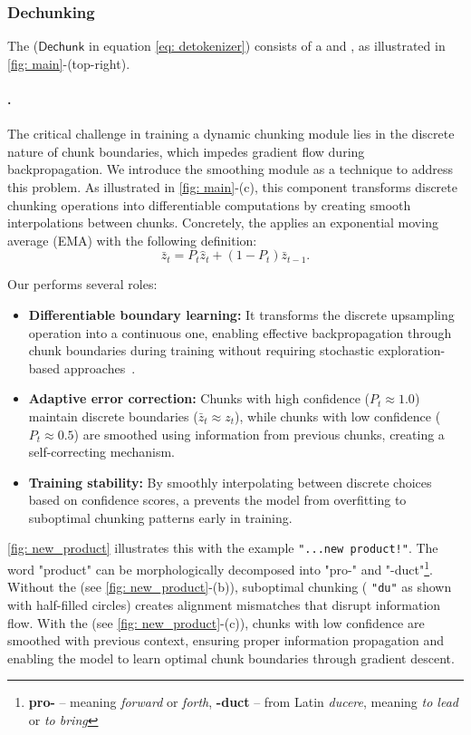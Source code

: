 \subsubsection{Dechunking}
\label{sec: detokenizer}

The \dechunk{} ($\mathsf{Dechunk}$ in equation \eqref{eq: detokenizer}) consists of a \smoother{} and \upsampler{}, as illustrated in \cref{fig: main}-(\colorbox{DeChunk}{top-right}).

\paragraph{\SMOOTHER{}.}
The critical challenge in training a dynamic chunking module lies in the discrete nature of chunk boundaries, which impedes gradient flow during backpropagation.
We introduce the smoothing module as a technique to address this problem.
As illustrated in \cref{fig: main}-(c), this component transforms discrete chunking operations into differentiable computations by creating smooth interpolations between chunks.
Concretely, the \smoother{} applies an exponential moving average (EMA) with the following definition:
\begin{equation}
    \label{eq: ema}
    \bar{z}_t = P_t \hat{z}_t + (1-P_t) \bar{z}_{t-1}.
\end{equation}



Our \smoother{} performs several roles:
\begin{itemize}
    \item \textbf{Differentiable boundary learning:} It transforms the discrete upsampling operation into a continuous one, enabling effective backpropagation through chunk boundaries during training without requiring stochastic exploration-based approaches~\citep{GumbelSoftmax}.
    \item \textbf{Adaptive error correction:} Chunks with high confidence ($P_t \approx 1.0$) maintain discrete boundaries ($\bar{z}_t \approx z_t$), while chunks with low confidence ($P_t \approx 0.5$) are smoothed using information from previous chunks, creating a self-correcting mechanism.
    \item \textbf{Training stability:} By smoothly interpolating between discrete choices based on confidence scores, a \smoother{} prevents the model from overfitting to suboptimal chunking patterns early in training.
\end{itemize}

\cref{fig: new_product} illustrates this with the example \texttt{"...new product!"}.
The word "product" can be morphologically decomposed into "pro-" and "-duct"\footnote{\textbf{pro-} -- meaning \emph{forward} or \emph{forth}, \textbf{-duct} -- from Latin \emph{ducere}, meaning \emph{to lead} or \emph{to bring}}.
Without the \smoother{} (see \cref{fig: new_product}-(b)), suboptimal chunking (\eg{} \texttt{"du"} as shown with half-filled circles) creates alignment mismatches that disrupt information flow.
With the \smoother{} (see \cref{fig: new_product}-(c)), chunks with low confidence are smoothed with previous context, ensuring proper information propagation and enabling the model to learn optimal chunk boundaries through gradient descent.

